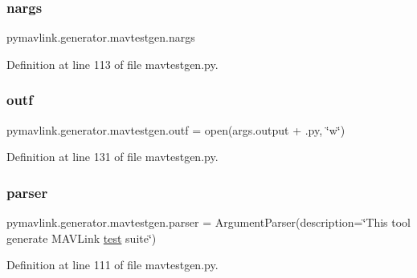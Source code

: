 \subsubsection{\texorpdfstring{nargs}{nargs}}
{\footnotesize\ttfamily pymavlink.\+generator.\+mavtestgen.\+nargs}



Definition at line 113 of file mavtestgen.\+py.

\mbox{\label{namespacepymavlink_1_1generator_1_1mavtestgen_a62d1fc41625a9ec5e92023a59bf698bf}} 
\subsubsection{\texorpdfstring{outf}{outf}}
{\footnotesize\ttfamily pymavlink.\+generator.\+mavtestgen.\+outf = open(args.\+output + \textquotesingle{}.py\textquotesingle{}, \char`\"{}w\char`\"{})}



Definition at line 131 of file mavtestgen.\+py.

\mbox{\label{namespacepymavlink_1_1generator_1_1mavtestgen_ab620e2ff96a457c9698e3708c7316838}} 
\subsubsection{\texorpdfstring{parser}{parser}}
{\footnotesize\ttfamily pymavlink.\+generator.\+mavtestgen.\+parser = Argument\+Parser(description=\char`\"{}This tool generate M\+A\+V\+Link \mbox{\hyperlink{classtest}{test}} suite\char`\"{})}



Definition at line 111 of file mavtestgen.\+py.

